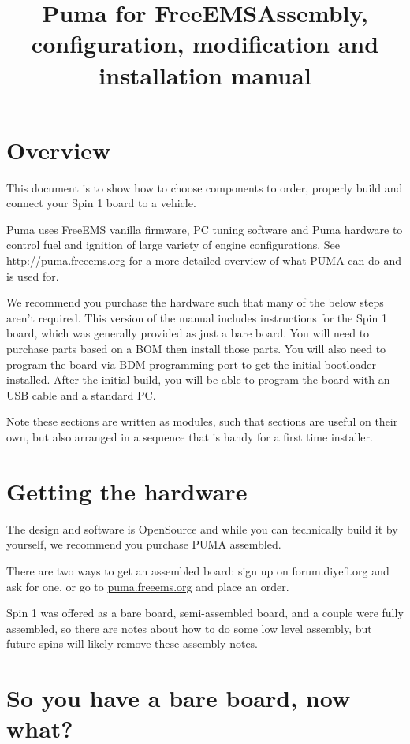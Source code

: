 \documentclass[12pt,a4paper,titlepage]{article}
\author{}
\title{Puma for FreeEMS\newline Assembly, configuration, modification and installation manual}
\begin{document}
\maketitle
\pagebreak

\tableofcontents
\thispagestyle{empty}
\pagebreak

\section{Overview}

This document is to show how to choose components to order, properly build and connect your Spin 1 board to a vehicle.

Puma uses FreeEMS vanilla firmware, PC tuning software and Puma hardware to control fuel and ignition of large variety of engine configurations. See \url{http://puma.freeems.org} for a more detailed overview of what PUMA can do and is used for.

We recommend you purchase the hardware such that many of the below steps aren't required. This version of the manual includes instructions for the Spin 1 board, which was generally provided as just a bare board. You will need to purchase parts based on a BOM then install those parts. You will also need to program the board via BDM programming port to get the initial bootloader installed. After the initial build, you will be able to program the board with an USB cable and a standard PC.

Note these sections are written as modules, such that sections are useful on their own, but also arranged in a sequence that is handy for a first time installer.

\section{Getting the hardware}

The design and software is OpenSource and while you can technically build it by yourself, we recommend you purchase PUMA assembled.

There are two ways to get an assembled board: sign up on forum.diyefi.org and ask for one, or go to \url{puma.freeems.org} and place an order.

Spin 1 was offered as a bare board, semi-assembled board, and a couple were fully assembled, so there are notes about how to do some low level assembly, but future spins will likely remove these assembly notes.

\section{So you have a bare board, now what?}
\end{document}
